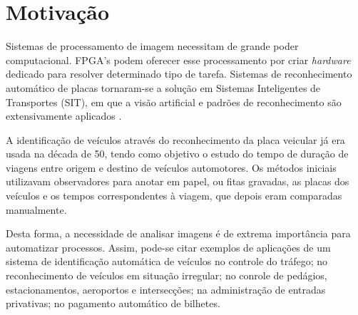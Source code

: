 \chapter{Motivação}

Sistemas de processamento de imagem necessitam de grande poder computacional.
FPGA's podem oferecer esse processamento por criar \textit {hardware} dedicado
para resolver determinado tipo de tarefa. Sistemas de reconhecimento automático de
placas tornaram-se a solução em Sistemas Inteligentes de Transportes (SIT), em
que a visão artificial e padrões de reconhecimento são extensivamente aplicados
\cite{GUANGZHI}.

A identificação de veículos através do reconhecimento da placa veicular já era
usada na década de 50, tendo como objetivo o estudo do tempo de duração de
viagens entre origem e destino de veículos automotores. Os métodos iniciais
utilizavam observadores para anotar em papel, ou fitas gravadas, as placas dos
veículos e os tempos correspondentes à viagem, que depois eram comparadas
manualmente.

Desta forma, a necessidade de analisar imagens é de extrema importância para
automatizar processos. Assim, pode-se citar exemplos de aplicações de um
sistema de identificação automática de veículos no controle do tráfego; no
reconhecimento de veículos em situação irregular; no conrole de pedágios,
estacionamentos, aeroportos e intersecções; na administração de entradas
privativas; no pagamento automático de bilhetes.



